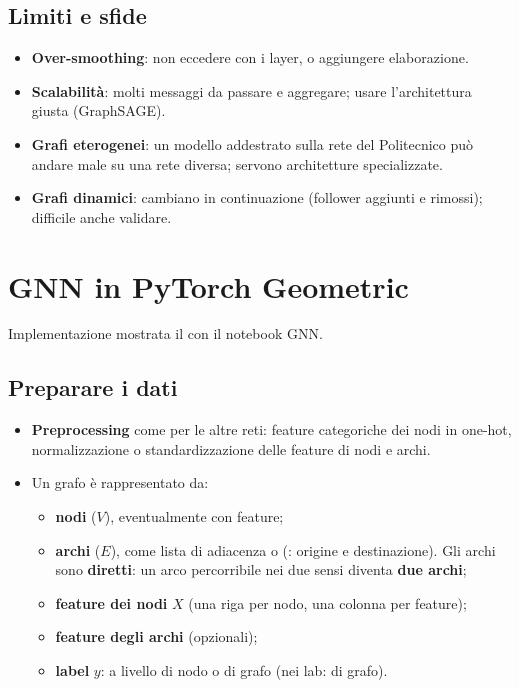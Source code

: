 \subsection{Limiti e sfide}
\begin{itemize}
  \item \textbf{Over-smoothing}: non eccedere con i layer, o aggiungere elaborazione.
  \item \textbf{Scalabilità}: molti messaggi da passare e aggregare; usare l'architettura giusta (GraphSAGE).
  \item \textbf{Grafi eterogenei}: un modello addestrato sulla rete del Politecnico può andare male su una rete diversa; servono architetture specializzate.
  \item \textbf{Grafi dinamici}: cambiano in continuazione (follower aggiunti e rimossi); difficile anche validare.
\end{itemize}

\section{GNN in PyTorch Geometric}
Implementazione mostrata il  con il notebook GNN.
\subsection{Preparare i dati}
\begin{itemize}
  \item \textbf{Preprocessing} come per le altre reti: feature categoriche dei nodi in one-hot, normalizzazione o standardizzazione delle
        feature di nodi e archi.
  \item Un grafo è rappresentato da:
  \begin{itemize}
    \item \textbf{nodi} ($V$), eventualmente con feature;
    \item \textbf{archi} ($E$), come lista di adiacenza o  (\code{[2, n\_archi]}: origine e destinazione). Gli archi sono
          \textbf{diretti}: un arco percorribile nei due sensi diventa \textbf{due archi};
    \item \textbf{feature dei nodi} $X$ (una riga per nodo, una colonna per feature);
    \item \textbf{feature degli archi} (opzionali);
    \item \textbf{label} $y$: a livello di nodo o di grafo (nei lab: di grafo).
  \end{itemize}
\end{itemize}

